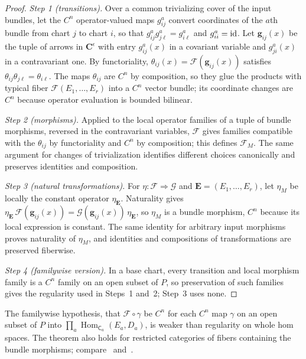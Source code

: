 \begin{proof}
\emph{Step 1 (transitions).} Over a common trivializing cover of the input bundles, let the $C^n$ operator-valued maps $g^a_{ij}$ convert coordinates of the $a$th bundle from chart $j$ to chart $i$, so that $g^a_{ij}g^a_{j\ell}=g^a_{i\ell}$ and $g^a_{ii}=\mathrm{id}$. Let $\mathbf g_{ij}(x)$ be the tuple of arrows in $\mathbf C^\epsilon$ with entry $g^a_{ij}(x)$ in a covariant variable and $g^a_{ji}(x)$ in a contravariant one. By functoriality, $\theta_{ij}(x)=\mathcal F(\mathbf g_{ij}(x))$ satisfies $\theta_{ij}\theta_{j\ell}=\theta_{i\ell}$. The maps $\theta_{ij}$ are $C^n$ by composition, so they glue the products with typical fiber $\mathcal F(E_1,\ldots,E_r)$ into a $C^n$ vector bundle; its coordinate changes are $C^n$ because operator evaluation is bounded bilinear.

\emph{Step 2 (morphisms).} Applied to the local operator families of a tuple of bundle morphisms, reversed in the contravariant variables, $\mathcal F$ gives families compatible with the $\theta_{ij}$ by functoriality and $C^n$ by composition; this defines $\mathcal F_M$. The same argument for changes of trivialization identifies different choices canonically and preserves identities and composition.

\emph{Step 3 (natural transformations).} For $\eta\colon\mathcal F\Rightarrow\mathcal G$ and $\mathbf E=(E_1,\ldots,E_r)$, let $\eta_M$ be locally the constant operator $\eta_{\mathbf E}$. Naturality gives $\eta_{\mathbf E}\,\mathcal F(\mathbf g_{ij}(x))=\mathcal G(\mathbf g_{ij}(x))\,\eta_{\mathbf E}$, so $\eta_M$ is a bundle morphism, $C^n$ because its local expression is constant. The same identity for arbitrary input morphisms proves naturality of $\eta_M$, and identities and compositions of transformations are preserved fiberwise.

\emph{Step 4 (familywise version).} In a base chart, every transition and local morphism family is a $C^n$ family on an open subset of $P$, so preservation of such families gives the regularity used in Steps~1 and~2; Step~3 uses none.
\end{proof}

The familywise hypothesis, that $\mathcal F\circ\gamma$ be $C^n$ for each $C^n$ map $\gamma$ on an open subset of $P$ into $\prod_a\operatorname{Hom}_{\mathsf C_a}(E_a,D_a)$, is weaker than regularity on whole hom spaces. The theorem also holds for restricted categories of fibers containing the bundle morphisms; compare~\cite{G2,La} and~\cite[n\textsuperscript{os}~7.6.1--7.6.4]{Bou}.

